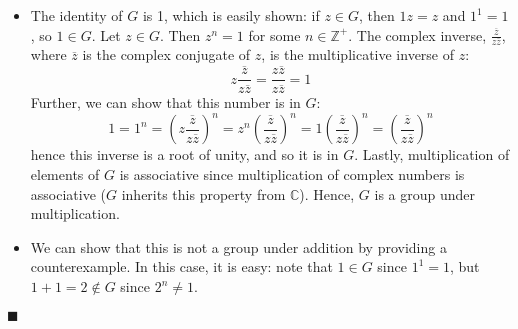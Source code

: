 \documentclass[12pt]{article}
\renewcommand{\qed}{\hfill$\blacksquare$}
\renewenvironment{proof}{\begin{addmargin}[1em]{0em}\begin{newproof}}{\end{newproof}\end{addmargin}\qed}
\begin{document}
\begin{proof}
\begin{itemize}
    \item The identity of $G$ is 1, which is easily shown: if $z\in G$, then $1z = z$ and $1^1 = 1$, so $1\in G$. Let $z \in G$. Then $z^n = 1$ for some $n\in \mathbb{Z}^+$. The complex inverse, $\frac{\overline{z}}{z\overline{z}}$, where $\overline{z}$ is the complex conjugate of $z$, is the multiplicative inverse of $z$:
    $$ z \frac{\overline{z}}{z\overline{z}} = \frac{z\overline{z}}{z\overline{z}} = 1 $$ Further, we can show that this number is in $G$:
    $$ 1 = 1^n = \left(z \frac{\overline{z}}{z\overline{z}}\right)^n = z^n \left(\frac{\overline{z}}{z\overline{z}}\right)^n = 1 \left(\frac{\overline{z}}{z\overline{z}}\right)^n = \left(\frac{\overline{z}}{z\overline{z}}\right)^n $$ hence this inverse is a root of unity, and so it is in $G$. Lastly, multiplication of elements of $G$ is associative since multiplication of complex numbers is associative ($G$ inherits this property from $\mathbb{C}$). Hence, $G$ is a group under multiplication.
    \item We can show that this is not a group under addition by providing a counterexample. In this case, it is easy: note that $1\in G$ since $1^1 = 1$, but $1+1=2 \notin G$ since $2^n \neq 1$.
\end{itemize}
\end{proof}
\end{document}

